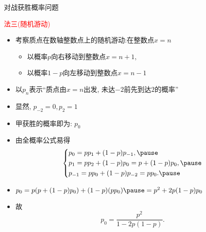 \begin{frame}{对战获胜概率问题}
	\begin{jieda}
		\textcolor{red}{法三(随机游动)}
		\begin{itemize}[<+-|alert@+>]
			\item 考察质点在数轴整数点上的随机游动:在整数点$x=n$
			\begin{itemize}[<+-|alert@+>]
				\item 以概率$p$向右移动到整数点$x=n+1$,
				\item 以概率$1-p$向左移动到整数点$x=n-1$
			\end{itemize}
			\item 以$p_n$表示“质点由$x=n$出发, 未达$-2$前先到达$2$的概率”
			\item 显然, $p_{-2}=0,p_2=1$
			\item 甲获胜的概率即为: $p_0$
			\item 由全概率公式易得
			\begin{equation}
				\left\{
				\begin{aligned}
					&p_0=pp_1+(1-p)p_{-1}, \pause \\ \notag
					&p_1=pp_2+(1-p)p_0=p+(1-p)p_0, \pause \\
					&p_{-1}=pp_0+(1-p)p_{-2}=pp_0.\pause
				\end{aligned}
				\right.
			\end{equation}\pause
			\item $p_0=p(p+(1-p)p_0)+(1-p)(pp_0)\pause =p^2+2p(1-p)p_0$\pause
			\item 故 $$p_0=\dfrac{p^2}{1-2p(1-p)}.$$
		\end{itemize}
	\end{jieda}
\end{frame}





